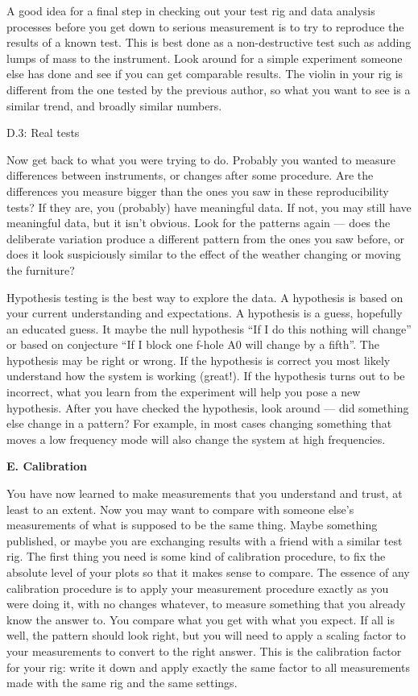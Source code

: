   A good idea for a final step in checking out your test rig and data analysis 
  processes before you get down to serious measurement is to try to reproduce 
  the results of a known test. This is best done as a non-destructive test such 
  as adding lumps of mass to the instrument. Look around for a simple 
  experiment someone else has done and see if you can get comparable results. 
  The violin in your rig is different from the one tested by the previous 
  author, so what you want to see is a similar trend, and broadly similar 
  numbers. 

  D.3: Real tests 

  Now get back to what you were trying to do. Probably you wanted to measure 
  differences between instruments, or changes after some procedure. Are the 
  differences you measure bigger than the ones you saw in these reproducibility 
  tests? If they are, you (probably) have meaningful data. If not, you may 
  still have meaningful data, but it isn’t obvious. Look for the patterns again 
  — does the deliberate variation produce a different pattern from the ones you 
  saw before, or does it look suspiciously similar to the effect of the weather 
  changing or moving the furniture? 

  Hypothesis testing is the best way to explore the data. A hypothesis is based 
  on your current understanding and expectations. A hypothesis is a guess, 
  hopefully an educated guess. It maybe the null hypothesis “If I do this 
  nothing will change” or based on conjecture “If I block one f-hole A0 will 
  change by a fifth”. The hypothesis may be right or wrong. If the hypothesis 
  is correct you most likely understand how the system is working (great!). If 
  the hypothesis turns out to be incorrect, what you learn from the experiment 
  will help you pose a new hypothesis. After you have checked the hypothesis, 
  look around — did something else change in a pattern? For example, in most 
  cases changing something that moves a low frequency mode will also change the 
  system at high frequencies. 

  \textbf{E. Calibration} 

  You have now learned to make measurements that you understand and trust, at 
  least to an extent. Now you may want to compare with someone else’s 
  measurements of what is supposed to be the same thing. Maybe something 
  published, or maybe you are exchanging results with a friend with a similar 
  test rig. The first thing you need is some kind of calibration procedure, to 
  fix the absolute level of your plots so that it makes sense to compare. The 
  essence of any calibration procedure is to apply your measurement procedure 
  exactly as you were doing it, with no changes whatever, to measure something 
  that you already know the answer to. You compare what you get with what you 
  expect. If all is well, the pattern should look right, but you will need to 
  apply a scaling factor to your measurements to convert to the right answer. 
  This is the calibration factor for your rig: write it down and apply exactly 
  the same factor to all measurements made with the same rig and the same 
  settings. 


